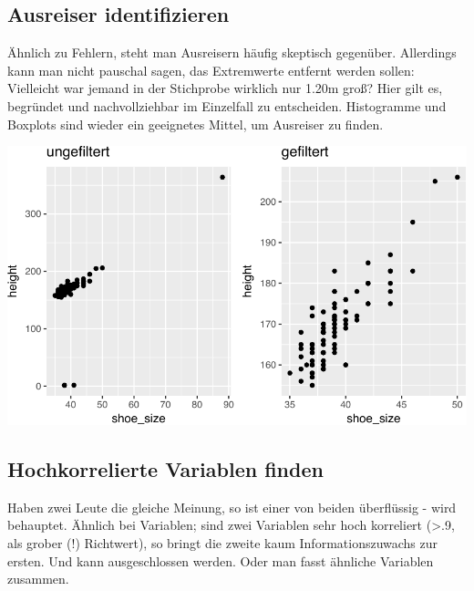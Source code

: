 \documentclass[12pt,ngerman,]{book}
\newenvironment{Shaded}{\begin{snugshade}}{\end{snugshade}}
\newcommand{\KeywordTok}[1]{\textcolor[rgb]{0.13,0.29,0.53}{\textbf{{#1}}}}
\newcommand{\StringTok}[1]{\textcolor[rgb]{0.31,0.60,0.02}{{#1}}}
\newcommand{\CommentTok}[1]{\textcolor[rgb]{0.56,0.35,0.01}{\textit{{#1}}}}
\newcommand{\NormalTok}[1]{{#1}}
\renewenvironment{Shaded}{\begin{kframe}}{\end{kframe}}
\begin{document}
\subsection{Ausreiser identifizieren}\label{ausreiser-identifizieren}

Ähnlich zu Fehlern, steht man Ausreisern häufig skeptisch gegenüber.
Allerdings kann man nicht pauschal sagen, das Extremwerte entfernt
werden sollen: Vielleicht war jemand in der Stichprobe wirklich nur
1.20m groß? Hier gilt es, begründet und nachvollziehbar im Einzelfall zu
entscheiden. Histogramme und Boxplots sind wieder ein geeignetes Mittel,
um Ausreiser zu finden.

\begin{center}\includegraphics[width=0.7\linewidth]{043_Typische_Probleme_Datenanalyse_files/figure-latex/unnamed-chunk-9-1} \end{center}

\subsection{Hochkorrelierte Variablen
finden}\label{hochkorrelierte-variablen-finden}

Haben zwei Leute die gleiche Meinung, so ist einer von beiden
überflüssig - wird behauptet. Ähnlich bei Variablen; sind zwei Variablen
sehr hoch korreliert (\textgreater{}.9, als grober (!) Richtwert), so
bringt die zweite kaum Informationszuwachs zur ersten. Und kann
ausgeschlossen werden. Oder man fasst ähnliche Variablen zusammen.

\begin{Shaded}
\end{Shaded}
\end{document}
